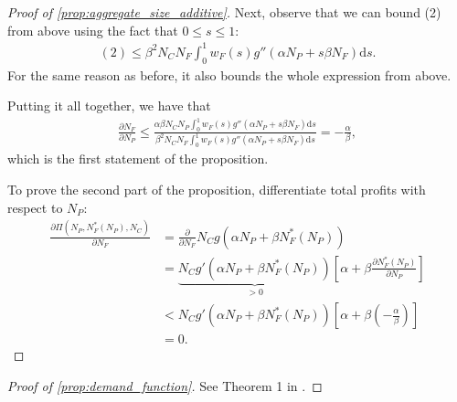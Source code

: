 \documentclass[a4paper]{article}
\newcommand{\ds}{\mathrm{d}s}
\begin{document}
\begin{proof}[Proof of \cref{prop:aggregate_size_additive}]
    Next, observe that we can bound (2) from above using the fact that $0 \leq s \leq 1$:
    \begin{align*}
        (2) \leq \beta^2 N_C N_F \int_0^1 w_F(s) g''(\alpha N_P + s \beta N_F) \ds.
    \end{align*}
    For the same reason as before, it also bounds the whole expression from above.

    Putting it all together, we have that
    \begin{align*}
        \frac{\partial N_F}{\partial N_P} \leq \frac{\alpha \beta N_C N_P \int_0^1 w_F(s) g''(\alpha N_P + s \beta N_F) \ds}{\beta^2 N_C N_F \int_0^1 w_F(s) g''(\alpha N_P + s \beta N_F) \ds} = -\frac{\alpha}{\beta},
    \end{align*}
    which is the first statement of the proposition.

    To prove the second part of the proposition, differentiate total profits with respect to $N_P$:
    \begin{align*}
        \frac{\partial \Pi(N_P, N_F^*(N_P), N_C)}{\partial N_F} &= \frac{\partial}{\partial N_F} N_C g(\alpha N_P + \beta N_F^*(N_P)) \\
        &= \underbrace{N_C g'(\alpha N_P + \beta N_F^*(N_P))}_{> 0} \left[ \alpha + \beta \frac{\partial N_F^*(N_P)}{\partial N_P} \right] \\
        &< N_C g'(\alpha N_P + \beta N_F^*(N_P)) \left[ \alpha + \beta \left( -\frac{\alpha}{\beta} \right) \right] \\
        &= 0.
    \end{align*}
\end{proof}

\begin{proof}[Proof of \cref{prop:demand_function}]
    See Theorem 1 in \textcite{anderson2021hybrid}.
\end{proof}
\end{document}
